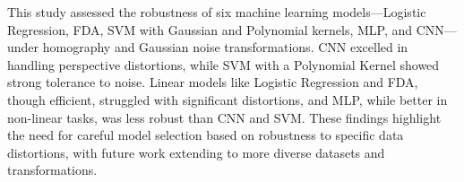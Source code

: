 \documentclass{article}
\begin{document}
This study assessed the robustness of six machine learning models—Logistic Regression, FDA, SVM with Gaussian and Polynomial kernels, MLP, and CNN—
under homography and Gaussian noise transformations. CNN excelled in handling perspective distortions, while SVM with a Polynomial Kernel showed strong tolerance to noise. 
Linear models like Logistic Regression and FDA, though efficient, struggled with significant distortions, and MLP, while better in non-linear tasks, was less robust than CNN and SVM. 
These findings highlight the need for careful model selection based on robustness to specific data distortions, with future work extending to more diverse datasets and transformations.
\end{document}
